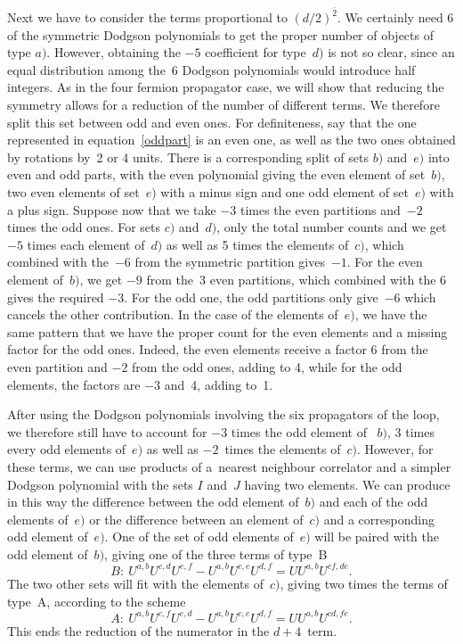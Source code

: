 \documentclass[pdftex]{sigma}
\numberwithin{equation}{section}
\begin{document}
Next we have to consider the terms proportional to $(d/2)^{\bar 2}$. We certainly need 6 of the symmetric
Dodgson polynomials to get the proper number of objects of type $a)$. However, obtaining the $-5$ coefficient
for type~$d)$ is not so clear, since an equal distribution among the~6 Dodgson polynomials would introduce
half integers. As in
the four fermion propagator case, we will show that reducing the symmetry allows for a reduction of the number of
different terms. We therefore split this set between odd and even ones. For definiteness, say that the one
represented in equation~\eqref{oddpart} is an even one, as well as the two ones obtained by rotations by~2 or 4 units.
There is a corresponding split of sets $b)$ and~$e)$ into even and odd parts, with the even polynomial giving
the even element of set~$b)$, two even elements of set~$e)$ with a minus sign and one odd element of
set~$e)$ with a plus sign. Suppose now that we take $-3$ times the even partitions and~$-2$ times the odd
ones. For sets $c)$ and~$d)$, only the total number counts and we get $-5$ times each element of~$d)$ as
well as 5 times the elements of~$c)$, which combined with the~$-6$ from the symmetric partition gives~$-1$.
For the even element of~$b)$, we get $-9$ from the~3 even partitions, which combined with the 6 gives the
required $-3$. For the odd one, the odd partitions only give~$-6$ which cancels the other contribution. In
the case of the elements of~$e)$, we have the same pattern that we have the proper count for the even elements
and a missing factor for the odd ones. Indeed, the even elements receive a factor 6 from the even partition and
$-2$ from the odd ones, adding to 4, while for the odd elements, the factors are $-3$ and~4, adding to~1.

After using the Dodgson polynomials involving the six propagators of the loop, we therefore still have to account
for $-3$ times the odd element of ~$b)$, 3 times every odd elements of~$e)$ as well as $-2$~times the
elements of~$c)$. However, for these terms, we can use products of a~nearest neighbour correlator and a
simpler Dodgson polynomial with the sets $I$ and~$J$ having two elements. We can produce in this way the
difference between the odd element of~$b)$ and each of the odd elements of~$e)$ or the difference between an
element of~$c)$ and a corresponding odd element of~$e)$. One of the set of odd elements of~$e)$ will be
paired with the odd element of~$b)$, giving one of the three terms of type~B
\begin{equation}
\label{Bterm}
B\colon\ U^{a,b} U^{c,d} U^{e,f} - U^{a,b} U^{c,e} U^{d,f} = U U^{a,b} U^{cf,de}.
\end{equation}
The two other sets will fit with the elements of~$c)$, giving two times the terms of type~A, according to the scheme{\samepage
\begin{equation}
\label{Aterm}
A\colon\ U^{a,b} U^{c,f} U^{e,d} - U^{a,b} U^{c,e} U^{d,f} = U U^{a,b} U^{cd,fe}.
\end{equation}
This ends the reduction of the numerator in the $d+4$~term.}
\end{document}
